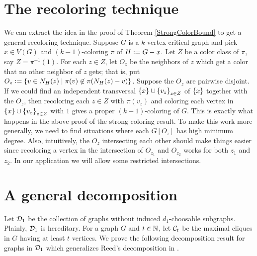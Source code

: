 \section{The recoloring technique}\label{recolorsection}
We can extract the idea in the proof of Theorem \ref{StrongColorBound} to get a
general recoloring technique.  Suppose $G$ is a $k$-vertex-critical graph and
pick $x \in V(G)$ and $(k-1)$-coloring $\pi$ of $H \mathrel{\mathop:}= G - x$.  Let $Z$
be a color class of $\pi$, say $Z = \pi^{-1}(1)$.  For each $z \in Z$, let
$O_z$ be the neighbors of $z$ which get a color that no other neighbor of $z$ gets; that is, put
$O_z \mathrel{\mathop:}= \left\{ v \in N_H(z) \mid \pi(v) \not \in \pi(N_H(z) - v) \right\}$.  Suppose the
$O_z$ are pairwise disjoint.  If we could find an independent transversal
$\left\{ x \right\} \cup \left\{ v_z \right\}_{z \in Z}$ of $\left\{ x \right\}$ together with the $O_z$, then
recoloring each $z \in Z$ with $\pi(v_z)$ and coloring each vertex in $\left\{ x \right\}
\cup \left\{ v_z \right\}_{z \in Z}$ with $1$ gives a proper $(k-1)$-coloring of $G$.  This
is exactly what happens in the above proof of the strong coloring result.  To
make this work more generally, we need to find situations where each $G[O_z]$
has high minimum degree.  Also, intuitively, the $O_z$ intersecting each other
should make things easier since recoloring a vertex in the intersection of
$O_{z_1}$ and $O_{z_2}$ works for both $z_1$ and $z_2$.  In our application we
will allow some restricted intersections.

\section{A general decomposition}\label{GeneralDecomposition}
Let $\mathcal{D}_1$ be the collection of graphs without induced $d_1$-choosable
subgraphs.  Plainly, $\mathcal{D}_1$ is hereditary. For a graph $G$ and $t \in \mathbb{N}$, let
$\mathcal{C}_t$ be the maximal cliques in $G$ having at least $t$ vertices. We prove the
following decomposition result for graphs in $\mathcal{D}_1$ which generalizes Reed's decomposition in \cite{reed1999strengthening}.

